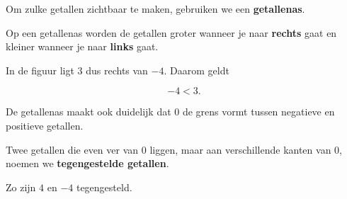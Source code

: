 \documentclass{ximera}
\begin{document}
Om zulke getallen zichtbaar te maken, gebruiken we een
\textbf{getallenas}.

\begin{center}
\end{center}

Op een getallenas worden de getallen groter wanneer je naar
\textbf{rechts} gaat en kleiner wanneer je naar \textbf{links} gaat.

In de figuur ligt \(3\) dus rechts van \(-4\). Daarom geldt

\[
-4<3.
\]

De getallenas maakt ook duidelijk dat \(0\) de grens vormt tussen
negatieve en positieve getallen.




Twee getallen die even ver van \(0\) liggen, maar aan verschillende kanten
van \(0\), noemen we \textbf{tegengestelde getallen}.

Zo zijn \(4\) en \(-4\) tegengesteld.

\begin{center}
\end{center}
\end{document}
